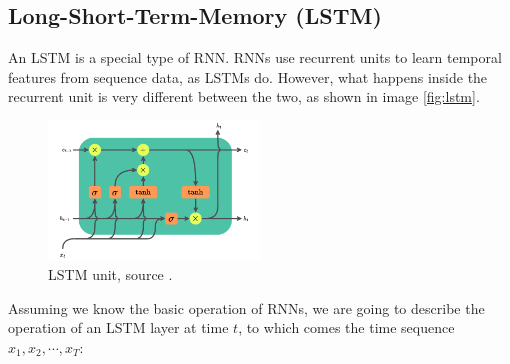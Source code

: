 \subsection{Long-Short-Term-Memory (LSTM)}

An LSTM is a special type of RNN. RNNs use recurrent units to learn temporal features from sequence data, as LSTMs do. However, what happens inside the recurrent unit is very different between the two, as shown in image \vref{fig:lstm}.


\begin{figure}
	\includegraphics[width=0.5\textwidth]{images/lstm}
	\caption{LSTM unit, source \cite{wiki:lstm}.}
	\label{fig:lstm}
\end{figure}

Assuming we know the basic operation of RNNs, we are going to describe the operation of an LSTM layer at time $t$, to which comes the time sequence $x_1, x_2, \cdots, x_T$:

